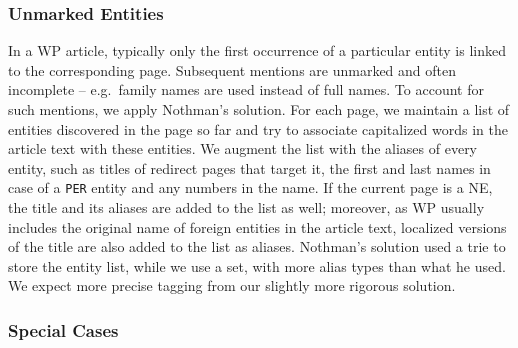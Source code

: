 \documentclass[11pt]{article}
\begin{document}
\subsubsection{Unmarked Entities}

In a WP article, typically only the first occurrence of a particular entity is
linked to the corresponding page. Subsequent mentions are unmarked and often
incomplete -- e.g.~family names are used instead of full names. To account
for such mentions, we apply Nothman's  solution. For
each page, we maintain a list of entities discovered in the page so far and
try to associate capitalized words in the article text with these entities. We
augment the list with the aliases of every entity, such as titles of redirect
pages that target it, the first and last names in case of a \texttt{PER}
entity and any numbers in the name. If the current page is a NE, the
title and its aliases are added to the list as well; moreover, as WP usually
includes the original name of foreign entities in the article text, localized
versions of the title are also added to the list as aliases. Nothman's
solution used a trie to store the entity list, while we use a set, with more
alias types than what he used. We expect more precise tagging from our
slightly more rigorous solution.

\subsubsection{Special Cases}

\end{document}
